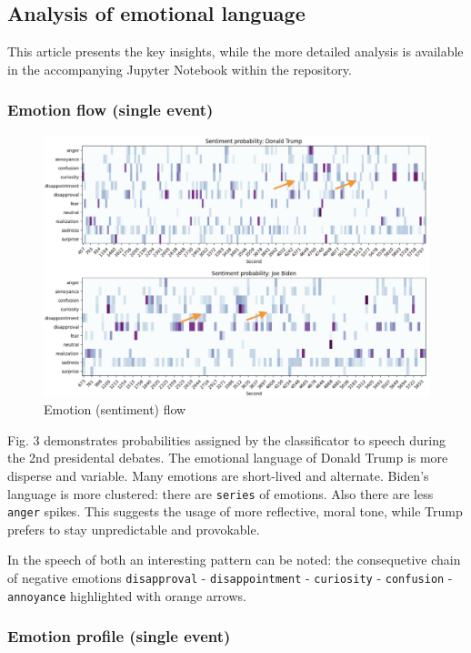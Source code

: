 \documentclass[pdflatex,sn-mathphys-num]{sn-jnl}%
\begin{document}
\subsection{Analysis of emotional language}
This article presents the key insights, while the more detailed analysis is available in the accompanying Jupyter Notebook within the repository.

\subsubsection{Emotion flow (single event)}

\begin{figure}[h]
	\centering
	\includegraphics[width=13cm]{f3-emotion_flow.png}
	\caption{Emotion (sentiment)  flow}
\end{figure}

Fig. 3 demonstrates probabilities assigned by the classificator to speech during the 2nd presidental debates.
The emotional language of Donald Trump is more disperse and variable. Many emotions are short-lived and alternate.
Biden's language is more clustered: there are \texttt{series} of emotions. Also there are less \texttt{anger} spikes. This suggests the usage of more reflective, moral tone, while Trump prefers to stay unpredictable and provokable.

In the speech of both an interesting pattern can be noted: the consequetive chain of negative emotions \texttt{disapproval} - \texttt{disappointment} - \texttt{curiosity} - \texttt{confusion} - \texttt{annoyance} highlighted with orange arrows.

\subsubsection{Emotion profile (single event)}
\end{document}
